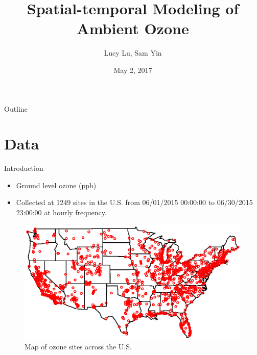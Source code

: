 \documentclass{beamer}
\title[]{Spatial-temporal Modeling of Ambient Ozone}
\author{Lucy Lu, Sam Yin}
\institute{DSS, Duke University}
\date{May 2, 2017}
\begin{document}
\begin{frame}
  \titlepage
\end{frame}

\begin{frame}{Outline}
  \tableofcontents
\end{frame}

\section{Data}

\begin{frame}{Introduction}
\begin{itemize}
\item Ground level ozone (ppb) 
\item Collected at 1249 sites in the U.S. from 06/01/2015 00:00:00 to 06/30/2015 23:00:00 at hourly frequency. 
\end{itemize}
\begin{figure}
\centering
\includegraphics[scale = 0.35]{site_map.eps}
\caption{Map of ozone sites across the U.S.}
\end{figure}
\end{frame}
\end{document}
